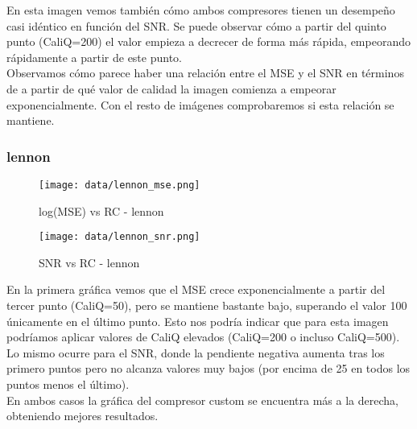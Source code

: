 \documentclass[12pt,a4paper]{article}
\begin{document}
En esta imagen vemos también cómo ambos compresores tienen un desempeño casi idéntico en función del SNR. Se puede observar cómo a partir del quinto punto (CaliQ=200) el valor empieza a decrecer de forma más rápida, empeorando rápidamente a partir de este punto.\\

Observamos cómo parece haber una relación entre el MSE y el SNR en términos de a partir de qué valor de calidad la imagen comienza a empeorar exponencialmente. Con el resto de imágenes comprobaremos si esta relación se mantiene.\\

\subsubsection{lennon}
\hspace*{-2.5em}
\begin{minipage}{0.5\textwidth}
        \centering
        \begin{figure}[H]
    \centering
    \texttt{[image: data/lennon\_mse.png]}
    \caption{log(MSE) vs RC - lennon}
    \label{len-mse}
    \end{figure}
    \end{minipage}\hfill
    \begin{minipage}{0.5\textwidth}
        \begin{figure}[H]
    \centering
    \texttt{[image: data/lennon\_snr.png]}
    \caption{SNR vs RC - lennon}
    \label{len-snr}
\end{figure}
\end{minipage}
\vspace{2em}

En la primera gráfica vemos que el MSE crece exponencialmente a partir del tercer punto (CaliQ=50), pero se mantiene bastante bajo, superando el valor 100 únicamente en el último punto. Esto nos podría indicar que para esta imagen podríamos aplicar valores de CaliQ elevados (CaliQ=200 o incluso CaliQ=500).\\

Lo mismo ocurre para el SNR, donde la pendiente negativa aumenta tras los primero puntos pero no alcanza valores muy bajos (por encima de 25 en todos los puntos menos el último).\\

En ambos casos la gráfica del compresor custom se encuentra más a la derecha, obteniendo mejores resultados.\\
\end{document}
